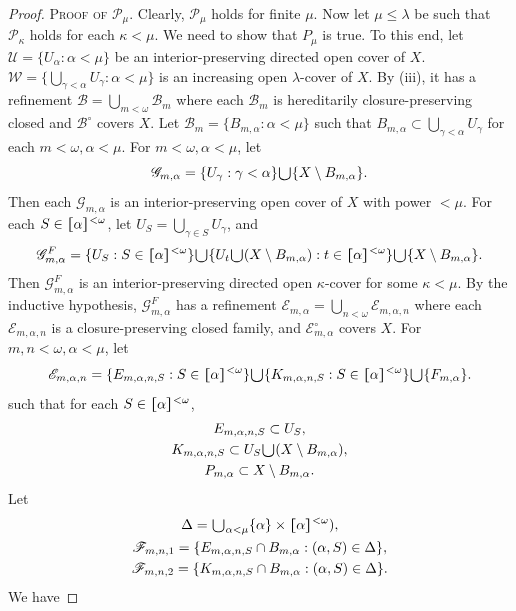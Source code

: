 \documentclass[jisng7iii.tex]{subfiles}
\begin{document}
\begin{proof}
\noindent\textsc{Proof of  $\mathcal{P}_\mu$}. 
Clearly, $\mathcal{P}_\mu$ holds for finite $\mu$. Now let $\mu \le \lambda$ be 
such that $\mathcal{P}_\kappa$ holds for each $\kappa < \mu$. 
We need to show that $P_{\mu}$ is true.
 To this end, let $\mathscr{U}=\{U_\alpha: \alpha< \mu\}$ be an interior-preserving
 directed open cover of $X$. 
 $\mathscr{W}=\{\bigcup_{\gamma < \alpha}U_\gamma: \alpha< \mu\}$   is an 
 increasing open $\lambda$-cover of $X$.
 By (iii), it has a refinement $\mathscr{B} = \bigcup_{m < \omega} \mathscr{B}_m$ 
 where each $\mathscr{B}_m$ is hereditarily closure-preserving closed and 
 $\mathscr{B}^\circ$ covers $X$.
Let $\mathscr{B}_m = \{B_{m,\alpha}: \alpha < \mu\}$ such that 
$B_{m,\alpha}\subset\bigcup_{\gamma < \alpha}U_\gamma$ for each $m < \omega,
\alpha < \mu$. 
For $m < \omega, \alpha < \mu$, let 
$$\mathscr{G}_{m, \alpha}= \{U_\gamma: \gamma < \alpha\}
\raisebox{-2pt}{\scalebox{1.5}{$\cup$}} \{X\setminus B_{m,\alpha}\}.$$
Then each $\mathscr{G}_{m,\alpha}$ is an interior-preserving open cover of $X$ with power $< \mu$.
For each $S\in \hstretch{1.8}{[}\alpha\hstretch{1.8}{]}^{<\omega}$, let $U_S = \bigcup_{\gamma\in S}U_\gamma$, and
$$\mathscr{G}_{m, \alpha}^F= \{U_S: S\in \hstretch{1.8}{[}\alpha\hstretch{1.8}{]}^{<\omega}\}
\raisebox{-2pt}{\scalebox{1.5}{$\cup$}} 
\{U_t \raisebox{-2pt}{\scalebox{1.5}{$\cup$}} (X\setminus B_{m,\alpha}):t\in \hstretch{1.8}{[}\alpha\hstretch{1.8}{]}^{<\omega}\}
\raisebox{-2pt}{\scalebox{1.5}{$\cup$}} \{X\setminus B_{m, \alpha}\}.$$
Then $\mathscr{G}_{m, \alpha}^F$ is an interior-preserving directed open $\kappa$-cover for some $\kappa< \mu$.
 By the inductive hypothesis, $\mathscr{G}_{m,\alpha}^F$ has a refinement 
 $\mathscr{E}_{m,\alpha} = \bigcup_{n < \omega} \mathscr{E}_{m,\alpha,n}$ where each 
 $\mathscr{E}_{m,\alpha,n}$ is a closure-preserving closed family,
 and  $\mathscr{E}_{m,\alpha}^\circ$ covers $X$.
For $m, n < \omega, \alpha < \mu$, let
$$\mathscr{E}_{m,\alpha,n} = \{E_{m,\alpha,n, S}:  S\in \hstretch{1.8}{[}\alpha\hstretch{1.8}{]}^{<\omega}\} \raisebox{-2pt}{\scalebox{1.5}{$\cup$}} 
  \{K_{m,\alpha,n, S}:  S\in \hstretch{1.8}{[}\alpha\hstretch{1.8}{]}^{<\omega}\} 
  \raisebox{-2pt}{\scalebox{1.5}{$\cup$}} \{F_{m,\alpha}\}.$$
such that for each $S\in \hstretch{1.8}{[}\alpha\hstretch{1.8}{]}^{<\omega}$, 
\begin{gather*}
	E_{m,\alpha,n,S} \subset U_S, \\
	K_{m,\alpha,n, S} \subset U_S \raisebox{-2pt}{\scalebox{1.5}{$\cup$}} (X\setminus B_{m, \alpha}), \\
	P_{m, \alpha} \subset X\setminus B_{m, \alpha}.
\end{gather*}
Let 
\begin{gather*}
	\Delta = \raisebox{-2pt}{\scalebox{1.5}{$\cup$}}_{\alpha < \mu} \{\alpha\} \times \hstretch{1.8}{[}\alpha\hstretch{1.8}{]}^{<\omega}), \\
	\mathscr{F}_{m, n,1} = \{E_{m, \alpha, n, S} \cap B_{m, \alpha}: (\alpha, S) \in \Delta\}, \\
	\mathscr{F}_{m, n,2} = \{K_{m, \alpha, n, S} \cap B_{m, \alpha}: (\alpha, S) \in \Delta\}. \\
\end{gather*}
We have


\end{proof}
\end{document}
